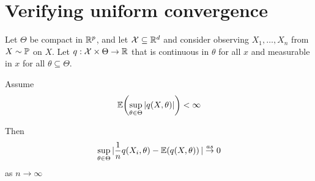 \section{Verifying uniform convergence}
\label{sec:verify-unif-conv}

\begin{proposition}
  Let $\Theta$ be compact in $\mathbb{R}^{p}$, and let $\mathcal{X} \subseteq \mathbb{R}^{d}$
  and consider observing $X_{1}, \dots, X_{n}$ \iid from $X \sim
  \Prob$ on $X$.  Let $q: \mathcal{X} \times \Theta \rightarrow \mathbb{R}$
  that is continuous in $\theta$ for all $x$ and measurable in $x$ for
  all $\theta \subseteq \Theta$.

  Assume
  \begin{equation}
    \label{eq:50}
    \E{\sup_{\theta \in \Theta} | q(X, \theta)|} < \infty
  \end{equation}

  Then
  \begin{equation}
    \label{eq:51}
    \sup_{\theta \in \Theta} | \frac{1}{n} q(X_{i}, \theta) - \E{q(X,
      \theta)} | \cas 0
  \end{equation} as $n \rightarrow \infty$
\end{proposition}

